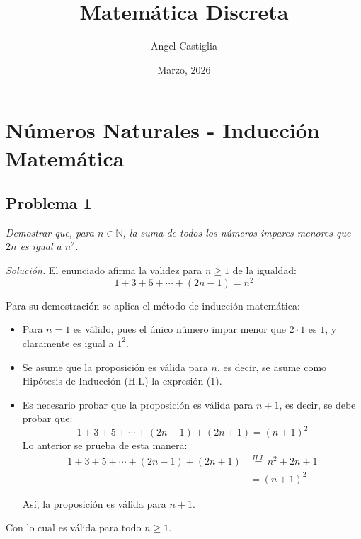 \documentclass{article}
\title{Matemática Discreta}
\author{Angel Castiglia}
\date{Marzo, 2026}
\begin{document}
\maketitle

\tableofcontents

\section{Números Naturales - Inducción Matemática}
\label{sec:induccion-matematica}

\subsection{Problema 1}
\label{sec:problema-1}

\textit{Demostrar que, para $n \in \mathbb{N}$, la suma de todos los números impares menores que $2n$ es igual a $n^2$.}

\bigskip

\textit{Solución.} El enunciado afirma la validez para $n \geq 1$ de la igualdad:
\begin{equation}
1 + 3 + 5 + \cdots + (2n - 1) = n^2 \label{eq:suma-impares} \tag{1}
\end{equation}

Para su demostración se aplica el método de inducción matemática:

\begin{itemize}
    \item Para $n = 1$ es válido, pues el único número impar menor que $2 \cdot 1$ es $1$, y claramente es igual a $1^2$.
    \item Se asume que la proposición es válida para $n$, es decir, se asume como Hipótesis de Inducción (H.I.) la expresión (1).
    \item Es necesario probar que la proposición es válida para $n + 1$, es decir, se debe probar que:
    \[
    1 + 3 + 5 + \cdots + (2n - 1) + (2n + 1) = (n + 1)^2
    \]
    Lo anterior se prueba de esta manera:
    \begin{align*}
    1 + 3 + 5 + \cdots + (2n - 1) + (2n + 1) &\stackrel{H.I.}{=} n^2 + 2n + 1 \\
    &= (n + 1)^2
    \end{align*}
  
    Así, la proposición es válida para $n + 1$.
\end{itemize}

Con lo cual es válida para todo $n \geq 1$.
\end{document}
